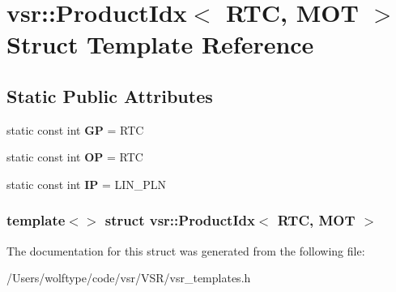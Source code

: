 \hypertarget{structvsr_1_1_product_idx_3_01_r_t_c_00_01_m_o_t_01_4}{\section{vsr\-:\-:Product\-Idx$<$ R\-T\-C, M\-O\-T $>$ Struct Template Reference}
\label{structvsr_1_1_product_idx_3_01_r_t_c_00_01_m_o_t_01_4}
}
\subsection*{Static Public Attributes}
\begin{DoxyCompactItemize}
\item 
\hypertarget{structvsr_1_1_product_idx_3_01_r_t_c_00_01_m_o_t_01_4_a888492341f0be72e0e1eaedc4f5e3b6a}{static const int {\bfseries G\-P} = R\-T\-C}\label{structvsr_1_1_product_idx_3_01_r_t_c_00_01_m_o_t_01_4_a888492341f0be72e0e1eaedc4f5e3b6a}

\item 
\hypertarget{structvsr_1_1_product_idx_3_01_r_t_c_00_01_m_o_t_01_4_ab76973c038036748a7b416e29b5fd69f}{static const int {\bfseries O\-P} = R\-T\-C}\label{structvsr_1_1_product_idx_3_01_r_t_c_00_01_m_o_t_01_4_ab76973c038036748a7b416e29b5fd69f}

\item 
\hypertarget{structvsr_1_1_product_idx_3_01_r_t_c_00_01_m_o_t_01_4_a48f879a4829dab871dfef77165672e0a}{static const int {\bfseries I\-P} = L\-I\-N\-\_\-\-P\-L\-N}\label{structvsr_1_1_product_idx_3_01_r_t_c_00_01_m_o_t_01_4_a48f879a4829dab871dfef77165672e0a}

\end{DoxyCompactItemize}
\subsubsection*{template$<$$>$ struct vsr\-::\-Product\-Idx$<$ R\-T\-C, M\-O\-T $>$}



The documentation for this struct was generated from the following file\-:\begin{DoxyCompactItemize}
\item 
/\-Users/wolftype/code/vsr/\-V\-S\-R/vsr\-\_\-templates.\-h\end{DoxyCompactItemize}
